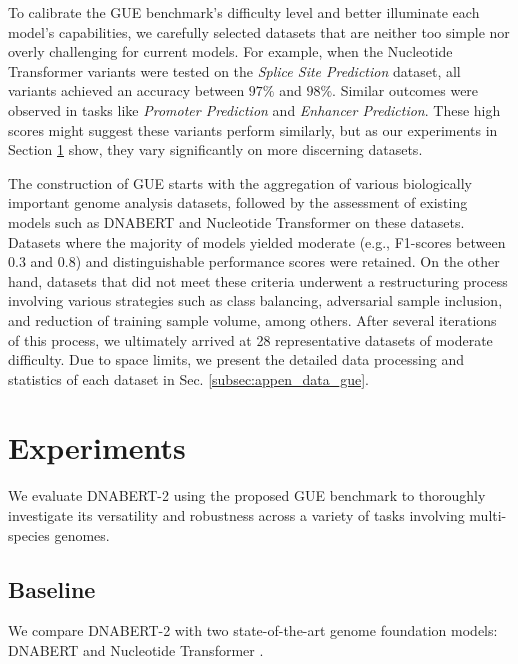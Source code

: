 \documentclass{article}
\begin{document}
To calibrate the GUE benchmark's difficulty level and better illuminate each model's capabilities, we carefully selected datasets that are neither too simple nor overly challenging for current models. For example, when the Nucleotide Transformer variants \citep{nt} were tested on the \textit{Splice Site Prediction} dataset, all variants achieved an accuracy between $97\%$ and $98\%$. Similar outcomes were observed in tasks like \textit{Promoter Prediction} and \textit{Enhancer Prediction}. These high scores might suggest these variants perform similarly, but as our experiments in Section \ref{sec:experiments} show, they vary significantly on more discerning datasets.



The construction of GUE starts with  the aggregation of various biologically important genome analysis datasets, followed by the assessment of existing models such as DNABERT \citep{dnabert} and Nucleotide Transformer \citep{nt} on these datasets. Datasets where the majority of models yielded moderate (e.g., F1-scores between 0.3 and 0.8) and distinguishable performance scores were retained. On the other hand, datasets that did not meet these criteria underwent a restructuring process involving various strategies such as class balancing, adversarial sample inclusion, and reduction of training sample volume, among others. After several iterations of this process, we ultimately arrived at 28 representative datasets of moderate difficulty. Due to space limits, we present the detailed data processing and statistics of each dataset in Sec. \ref{subsec:appen_data_gue}.



\section{Experiments}
\label{sec:experiments}

We evaluate DNABERT-2 using the proposed GUE benchmark to thoroughly investigate its versatility and robustness across a variety of tasks involving multi-species genomes.




\subsection{Baseline}
\label{subsec:experiments_baseline}

We compare DNABERT-2 with two state-of-the-art genome foundation models: DNABERT \citep{dnabert} and Nucleotide Transformer \citep{nt}. 
\end{document}
